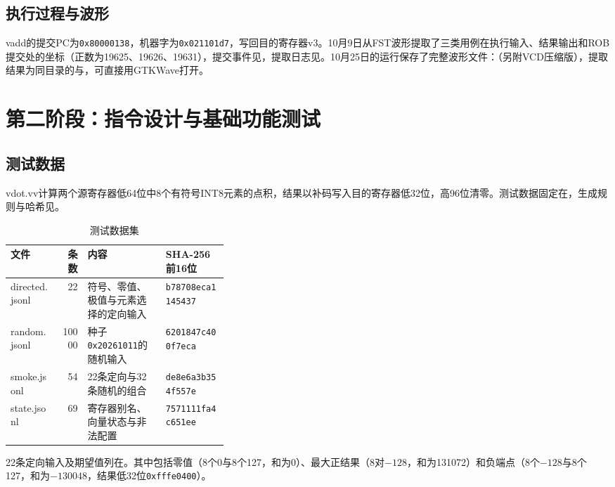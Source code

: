 \subsection{执行过程与波形}\label{sec:s1-wave}

vadd的提交PC为\texttt{0x80000138}，机器字为\texttt{0x021101d7}，写回目的寄存器v3。10月9日从FST波形提取了三类用例在执行输入、结果输出和ROB提交处的坐标（正数为19625、19626、19631），提交事件见，提取日志见。10月25日的运行保存了完整波形文件：（另附VCD压缩版），提取结果为同目录的与，可直接用GTKWave打开。

\section{第二阶段：指令设计与基础功能测试}

\subsection{测试数据}

vdot.vv计算两个源寄存器低64位中8个有符号INT8元素的点积，结果以补码写入目的寄存器低32位，高96位清零。测试数据固定在，生成规则与哈希见。

\begin{table}[!htbp]\centering\small
\caption{测试数据集}\label{tab:datasets}
\begin{tabular}{lrp{0.36\linewidth}l}
\toprule
文件 & 条数 & 内容 & SHA-256前16位\\
\midrule
directed.jsonl & 22 & 符号、零值、极值与元素选择的定向输入 & \texttt{b78708eca1145437}\\
random.jsonl & 10000 & 种子\texttt{0x20261011}的随机输入 & \texttt{6201847c400f7eca}\\
smoke.jsonl & 54 & 22条定向与32条随机的组合 & \texttt{de8e6a3b354f557e}\\
state.jsonl & 69 & 寄存器别名、向量状态与非法配置 & \texttt{7571111fa4c651ee}\\
\bottomrule
\end{tabular}
\end{table}

22条定向输入及期望值列在。其中包括零值（8个0与8个127，和为0）、最大正结果（8对$-128$，和为131072）和负端点（8个$-128$与8个127，和为$-130048$，结果低32位\texttt{0xfffe0400}）。


